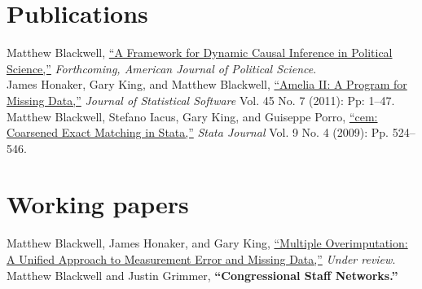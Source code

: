 \documentclass[margin,line]{res}
\newenvironment{list1}{
  \begin{list}{\ding{113}}{%
      \setlength{\itemsep}{0in}
      \setlength{\parsep}{0in} \setlength{\parskip}{0in}
      \setlength{\topsep}{0in} \setlength{\partopsep}{0in} 
      \setlength{\leftmargin}{0.83 cm}}}{\end{list}}
\begin{document}
\begin{resume}
\section{\sc Publications}

Matthew Blackwell,
\href{http://mattblackwell.org/files/papers/dynci.pdf}{``A Framework
  for Dynamic Causal Inference in Political Science,''}
\emph{Forthcoming, American Journal of Political Science}.\vspace{1em}\\
James Honaker, Gary King, and Matthew Blackwell, \href{http://www.mattblackwell.org/files/papers/amelia-jss.pdf}{``Amelia II: A
Program for Missing Data,''} \emph{Journal of Statistical Software}
Vol. 45 No. 7 (2011): Pp: 1--47.
\vspace{1em}\\
Matthew Blackwell, Stefano Iacus, Gary King, and Guiseppe Porro, \href{http://www.mattblackwell.org/files/papers/cemStata.pdf}{``cem: Coarsened Exact Matching in Stata,''} \emph{Stata
  Journal} Vol. 9 No. 4 (2009): Pp. 524--546.

\section{\sc Working papers}

Matthew Blackwell, James Honaker, and Gary King, \href{http://gking.harvard.edu/files/measure.pdf}{``Multiple Overimputation: A Unified Approach to Measurement Error and
Missing Data,''} \emph{Under review}.\vspace{1em}\\
Matthew Blackwell and Justin Grimmer, {\bf ``Congressional Staff Networks.''}



\end{resume}
\end{document}
